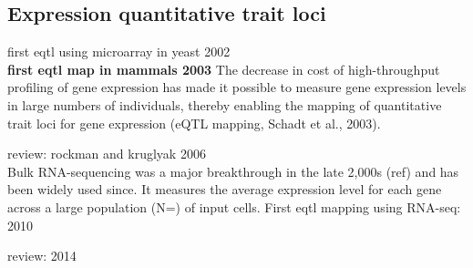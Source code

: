 






\subsection{Expression quantitative trait loci}

first eqtl using microarray in yeast 2002 \cite{brem2002genetic}\\

\textbf{first eqtl map in mammals 2003}
The decrease in cost of high-throughput profiling of gene expression has made it possible to measure gene expression levels in large numbers of individuals, thereby enabling the mapping of quantitative trait loci for gene expression (eQTL mapping, Schadt et al., 2003). \cite{schadt2003genetics}

review: rockman and kruglyak 2006 \cite{rockman2006genetics}\\

Bulk RNA-sequencing was a major breakthrough in the late 2,000s (ref) and has been widely used since.
It measures the average expression level for each gene across a large population (N=) of input cells. 
First eqtl mapping using RNA-seq: 2010
\cite{montgomery2010transcriptome, pickrell2010understanding}

review: 2014 \cite{westra2014genome}\\

